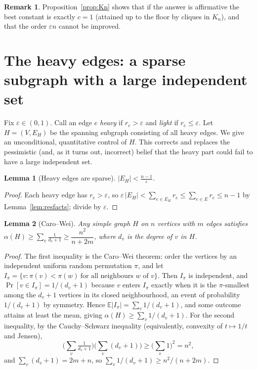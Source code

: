\documentclass[12pt]{article}
\newtheorem{lemma}{Lemma}
\theoremstyle{definition}
\newtheorem{remark}{Remark}
\newcommand{\E}{\mathbb{E}}
\newcommand{\eps}{\varepsilon}
\begin{document}
\begin{remark}
Proposition~\ref{prop:Kn} shows that if the answer is affirmative the best constant is exactly $c=1$
(attained up to the floor by cliques in $K_n$), and that the order $\eps n$ cannot be improved.
\end{remark}

\section{The heavy edges: a sparse subgraph with a large independent set}\label{sec:heavy}

Fix $\eps\in(0,1)$. Call an edge $e$ \emph{heavy} if $r_e>\eps$ and \emph{light} if $r_e\le\eps$.
Let $H=(V,E_H)$ be the spanning subgraph consisting of all heavy edges. We give an unconditional,
quantitative control of $H$. This corrects and replaces the pessimistic (and, as it turns out,
incorrect) belief that the heavy part could fail to have a large independent set.

\begin{lemma}[Heavy edges are sparse]\label{lem:heavysparse}
$\displaystyle |E_H|<\frac{n-1}{\eps}$.
\end{lemma}
\begin{proof}
Each heavy edge has $r_e>\eps$, so $\eps\,|E_H|<\sum_{e\in E_H}r_e\le\sum_{e\in E}r_e\le n-1$ by
Lemma~\ref{lem:resfacts}; divide by $\eps$.
\end{proof}

\begin{lemma}[Caro--Wei]\label{lem:carowei}
Any simple graph $H$ on $n$ vertices with $m$ edges satisfies
$\alpha(H)\ge\sum_{v}\frac1{d_v+1}\ge\dfrac{n^2}{n+2m}$, where $d_v$ is the degree of $v$ in $H$.
\end{lemma}
\begin{proof}
The first inequality is the Caro--Wei theorem: order the vertices by an independent uniform random
permutation $\pi$, and let $I_\pi=\{v: \pi(v)<\pi(w)\ \text{for all neighbours }w\text{ of }v\}$. Then
$I_\pi$ is independent, and $\Pr[v\in I_\pi]=1/(d_v+1)$ because $v$ enters $I_\pi$ exactly when it is
the $\pi$-smallest among the $d_v+1$ vertices in its closed neighbourhood, an event of probability
$1/(d_v+1)$ by symmetry. Hence $\E|I_\pi|=\sum_v 1/(d_v+1)$, and some outcome attains at least the
mean, giving $\alpha(H)\ge\sum_v 1/(d_v+1)$. For the second inequality, by the Cauchy--Schwarz
inequality (equivalently, convexity of $t\mapsto 1/t$ and Jensen),
\[
\Big(\sum_v\tfrac1{d_v+1}\Big)\Big(\sum_v(d_v+1)\Big)\ge\Big(\sum_v 1\Big)^2=n^2,
\]
and $\sum_v(d_v+1)=2m+n$, so $\sum_v 1/(d_v+1)\ge n^2/(n+2m)$.
\end{proof}
\end{document}
